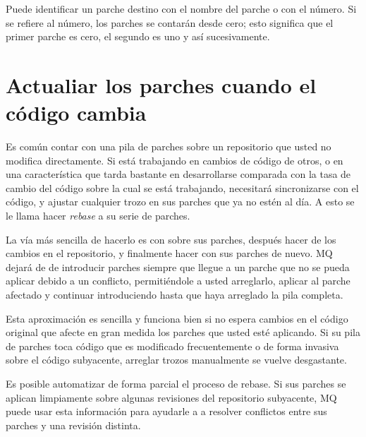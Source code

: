 Puede identificar un parche destino con el nombre del parche o con el
número.  Si se refiere al número, los parches se contarán desde cero;
esto significa que el primer parche es cero, el segundo es uno y así
sucesivamente.

\section{Actualiar los parches cuando el código cambia}
\label{sec:mq:merge}

Es común contar con una pila de parches sobre un repositorio que usted
no modifica directamente.  Si está trabajando en cambios de código de
otros, o en una característica que tarda bastante en desarrollarse
comparada con la tasa de cambio del código sobre la cual se está
trabajando, necesitará sincronizarse con el código, y ajustar
cualquier trozo en sus parches que ya no estén al día.  A esto se le
llama hacer \emph{rebase} a su serie de parches.

La vía más sencilla de hacerlo es con 
sobre sus parches, después hacer  de los cambios en el
repositorio, y finalmente hacer
 con sus parches de nuevo.  MQ
dejará de de introducir parches siempre que llegue a un parche que no se pueda
aplicar debido a un conflicto, permitiéndole a usted arreglarlo,
aplicar  al parche afectado y continuar
introduciendo hasta que haya arreglado la pila completa.

Esta aproximación es sencilla y funciona bien si no espera cambios en
el código original que afecte en gran medida los parches que usted
esté aplicando. Si su pila de parches toca código que es modificado
frecuentemente o de forma invasiva sobre el código subyacente,
arreglar trozos manualmente se vuelve desgastante.

Es posible automatizar de forma parcial el proceso de rebase.  Si sus
parches se aplican limpiamente sobre algunas revisiones del
repositorio subyacente, MQ puede usar esta información para ayudarle a
a resolver conflictos entre sus parches y una revisión distinta.

